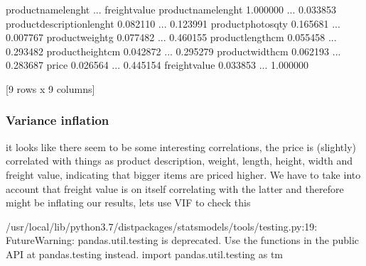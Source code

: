 \documentclass[letterpaper,10pt,english]{jupyterBook}
\begin{document}
\begin{sphinxVerbatim}[commandchars=\\\{\}]
                            product\PYGZus{}name\PYGZus{}lenght  ...  freight\PYGZus{}value
product\PYGZus{}name\PYGZus{}lenght                    1.000000  ...       0.033853
product\PYGZus{}description\PYGZus{}lenght             0.082110  ...       0.123991
product\PYGZus{}photos\PYGZus{}qty                     0.165681  ...       0.007767
product\PYGZus{}weight\PYGZus{}g                       0.077482  ...       0.460155
product\PYGZus{}length\PYGZus{}cm                      0.055458  ...       0.293482
product\PYGZus{}height\PYGZus{}cm                     \PYGZhy{}0.042872  ...       0.295279
product\PYGZus{}width\PYGZus{}cm                       0.062193  ...       0.283687
price                                  0.026564  ...       0.445154
freight\PYGZus{}value                          0.033853  ...       1.000000

[9 rows x 9 columns]
\end{sphinxVerbatim}


\subsubsection{Variance inflation}
\label{\detokenize{c7_case_studies/Olist:variance-inflation}}
\sphinxAtStartPar
it looks like there seem to be some interesting correlations, the price is (slightly) correlated with things as product description, weight, length, height, width and freight value, indicating that bigger items are priced higher.
We have to take into account that freight value is on itself correlating with the latter and therefore might be inflating our results, lets use VIF to check this

\begin{sphinxVerbatim}[commandchars=\\\{\}]
   
\end{sphinxVerbatim}

\begin{sphinxVerbatim}[commandchars=\\\{\}]
/usr/local/lib/python3.7/dist\PYGZhy{}packages/statsmodels/tools/\PYGZus{}testing.py:19: FutureWarning: pandas.util.testing is deprecated. Use the functions in the public API at pandas.testing instead.
  import pandas.util.testing as tm
\end{sphinxVerbatim}
\end{document}
